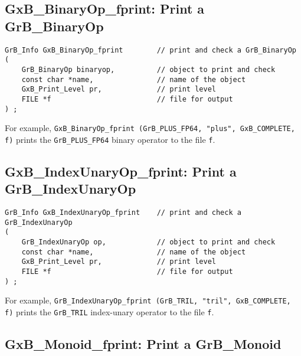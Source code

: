 \documentclass[12pt]{article}
\begin{document}
\subsection{{\sf GxB\_BinaryOp\_fprint:} Print a {\sf GrB\_BinaryOp}}

\begin{mdframed}[userdefinedwidth=6in]
{\footnotesize
\begin{verbatim}
GrB_Info GxB_BinaryOp_fprint        // print and check a GrB_BinaryOp
(
    GrB_BinaryOp binaryop,          // object to print and check
    const char *name,               // name of the object
    GxB_Print_Level pr,             // print level
    FILE *f                         // file for output
) ;
\end{verbatim} } \end{mdframed}

For example,
\verb'GxB_BinaryOp_fprint (GrB_PLUS_FP64, "plus", GxB_COMPLETE, f)' prints the
\verb'GrB_PLUS_FP64' binary operator to the file \verb'f'.


\subsection{{\sf GxB\_IndexUnaryOp\_fprint:} Print a {\sf GrB\_IndexUnaryOp}}

\begin{mdframed}[userdefinedwidth=6in]
{\footnotesize
\begin{verbatim}
GrB_Info GxB_IndexUnaryOp_fprint    // print and check a GrB_IndexUnaryOp
(
    GrB_IndexUnaryOp op,            // object to print and check
    const char *name,               // name of the object
    GxB_Print_Level pr,             // print level
    FILE *f                         // file for output
) ;
\end{verbatim} } \end{mdframed}

For example,
\verb'GrB_IndexUnaryOp_fprint (GrB_TRIL, "tril", GxB_COMPLETE, f)' prints
the \verb'GrB_TRIL' index-unary operator to the file \verb'f'.

\newpage
\subsection{{\sf GxB\_Monoid\_fprint:} Print a {\sf GrB\_Monoid}}
\end{document}
